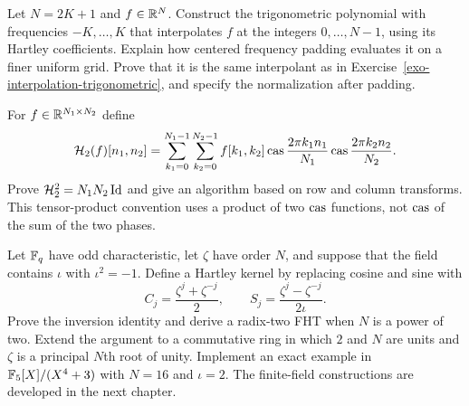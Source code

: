 
\begin{exo}
\label{exo-interpolation-transfo-hartley}
Let $N=2K+1$ and $f\in\mathbb{R}^N$. Construct the trigonometric polynomial with
frequencies $-K,\ldots,K$ that interpolates $f$ at the integers
$0,\ldots,N-1$, using its Hartley coefficients. Explain how centered
frequency padding evaluates it on a finer uniform grid. Prove that it is
the same interpolant as in Exercise~\ref{exo-interpolation-trigonometric},
and specify the normalization after padding.
\end{exo}


\begin{exo}
\label{exo-transfo-hartley-2d}
For $f\in\mathbb{R}^{N_1\times N_2}$ define
\[
 \mathcal{H}_2(f)[n_1,n_2]=\sum_{k_1=0}^{N_1-1}\sum_{k_2=0}^{N_2-1}
 f[k_1,k_2]\operatorname{cas}\frac{2\pi k_1n_1}{N_1}\operatorname{cas}\frac{2\pi k_2n_2}{N_2}.
\]
Prove $\mathcal{H}_2^2=N_1N_2\operatorname{Id}$ and give an algorithm based on row and column
transforms. This tensor-product convention uses a product of two
$\operatorname{cas}$ functions, not $\operatorname{cas}$ of the sum of the two phases.
\end{exo}


\begin{exo}
\label{exo-transfo-hartley-corps-finis}
Let $\mathbb{F}_q$ have odd characteristic, let $\zeta$ have order $N$, and
suppose that the field contains $\iota$ with $\iota^2=-1$. Define a
Hartley kernel by replacing cosine and sine with
\[
 C_j=\frac{\zeta^j+\zeta^{-j}}2,\qquad
 S_j=\frac{\zeta^j-\zeta^{-j}}{2\iota}.
\]
Prove the inversion identity and derive a radix-two FHT when $N$ is a
power of two. Extend the argument to a commutative ring in which $2$ and
$N$ are units and $\zeta$ is a principal $N$th root of unity.
Implement an exact example in $\mathbb{F}_5[X]/(X^4+3)$ with $N=16$ and $\iota=2$.
The finite-field constructions are developed in the next chapter.
\end{exo}


